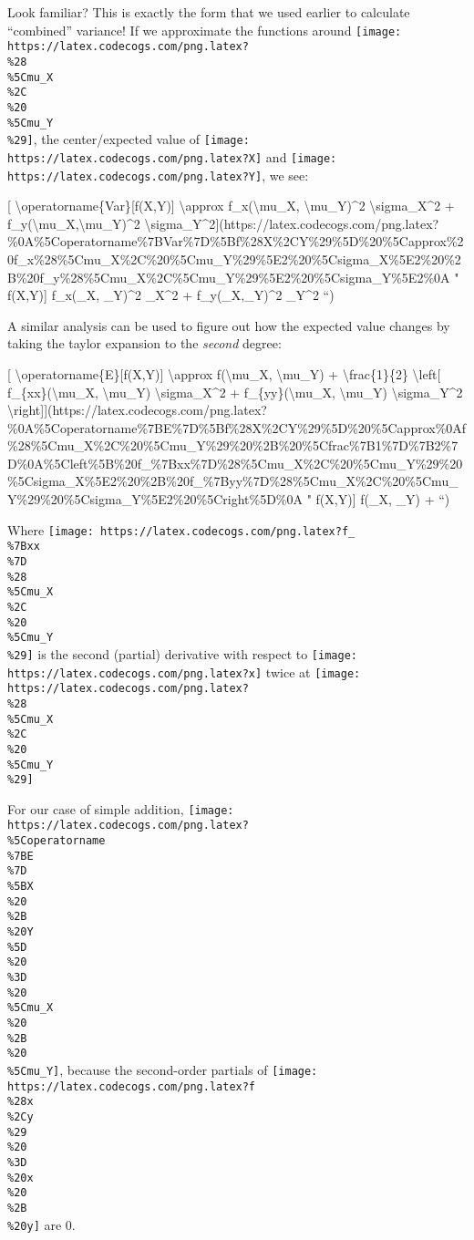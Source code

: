 \documentclass[]{article}
\begin{document}
Look familiar? This is exactly the form that we used earlier to calculate
``combined'' variance! If we approximate the functions around
\texttt{[image: https://latex.codecogs.com/png.latex?\\\%28\\\%5Cmu\_X\\\%2C\\\%20\\\%5Cmu\_Y\\\%29]},
the center/expected value of
\texttt{[image: https://latex.codecogs.com/png.latex?X]} and
\texttt{[image: https://latex.codecogs.com/png.latex?Y]}, we see:

{[} \textbackslash{}operatorname\{Var\}{[}f(X,Y){]} \textbackslash{}approx
f\_x(\textbackslash{}mu\_X, \textbackslash{}mu\_Y)\^{}2
\textbackslash{}sigma\_X\^{}2 +
f\_y(\textbackslash{}mu\_X,\textbackslash{}mu\_Y)\^{}2
\textbackslash{}sigma\_Y\^{}2{]}(https://latex.codecogs.com/png.latex?\%0A\%5Coperatorname\%7BVar\%7D\%5Bf\%28X\%2CY\%29\%5D\%20\%5Capprox\%20f\_x\%28\%5Cmu\_X\%2C\%20\%5Cmu\_Y\%29\%5E2\%20\%5Csigma\_X\%5E2\%20\%2B\%20f\_y\%28\%5Cmu\_X\%2C\%5Cmu\_Y\%29\%5E2\%20\%5Csigma\_Y\%5E2\%0A
" \operatorname{Var}{[}f(X,Y){]} \approx f\_x(\mu\_X, \mu\_Y)\^{}2
\sigma\_X\^{}2 + f\_y(\mu\_X,\mu\_Y)\^{}2 \sigma\_Y\^{}2 ``)

A similar analysis can be used to figure out how the expected value changes by
taking the taylor expansion to the \emph{second} degree:

{[} \textbackslash{}operatorname\{E\}{[}f(X,Y){]} \textbackslash{}approx
f(\textbackslash{}mu\_X, \textbackslash{}mu\_Y) + \textbackslash{}frac\{1\}\{2\}
\textbackslash{}left{[} f\_\{xx\}(\textbackslash{}mu\_X, \textbackslash{}mu\_Y)
\textbackslash{}sigma\_X\^{}2 + f\_\{yy\}(\textbackslash{}mu\_X,
\textbackslash{}mu\_Y) \textbackslash{}sigma\_Y\^{}2
\textbackslash{}right{]}{]}(https://latex.codecogs.com/png.latex?\%0A\%5Coperatorname\%7BE\%7D\%5Bf\%28X\%2CY\%29\%5D\%20\%5Capprox\%0Af\%28\%5Cmu\_X\%2C\%20\%5Cmu\_Y\%29\%20\%2B\%20\%5Cfrac\%7B1\%7D\%7B2\%7D\%0A\%5Cleft\%5B\%20f\_\%7Bxx\%7D\%28\%5Cmu\_X\%2C\%20\%5Cmu\_Y\%29\%20\%5Csigma\_X\%5E2\%20\%2B\%20f\_\%7Byy\%7D\%28\%5Cmu\_X\%2C\%20\%5Cmu\_Y\%29\%20\%5Csigma\_Y\%5E2\%20\%5Cright\%5D\%0A
" \operatorname{E}{[}f(X,Y){]} \approx
f(\mu\_X, \mu\_Y) + 
``)

Where
\texttt{[image: https://latex.codecogs.com/png.latex?f\_\\\%7Bxx\\\%7D\\\%28\\\%5Cmu\_X\\\%2C\\\%20\\\%5Cmu\_Y\\\%29]}
is the second (partial) derivative with respect to
\texttt{[image: https://latex.codecogs.com/png.latex?x]} twice at
\texttt{[image: https://latex.codecogs.com/png.latex?\\\%28\\\%5Cmu\_X\\\%2C\\\%20\\\%5Cmu\_Y\\\%29]}

For our case of simple addition,
\texttt{[image: https://latex.codecogs.com/png.latex?\\\%5Coperatorname\\\%7BE\\\%7D\\\%5BX\\\%20\\\%2B\\\%20Y\\\%5D\\\%20\\\%3D\\\%20\\\%5Cmu\_X\\\%20\\\%2B\\\%20\\\%5Cmu\_Y]},
because the second-order partials of
\texttt{[image: https://latex.codecogs.com/png.latex?f\\\%28x\\\%2Cy\\\%29\\\%20\\\%3D\\\%20x\\\%20\\\%2B\\\%20y]}
are 0.
\end{document}
